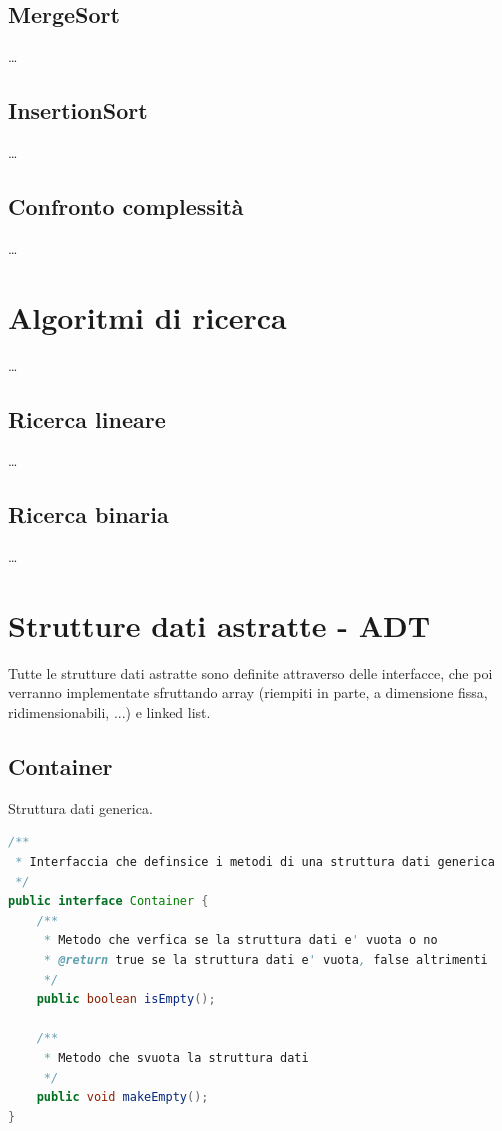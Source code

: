 \documentclass{article}
\begin{document}
\subsection{MergeSort}
\dots

\subsection{InsertionSort}
\dots

\subsection{Confronto complessità}
\dots

\section{Algoritmi di ricerca}
\dots

\subsection{Ricerca lineare}
\dots

\subsection{Ricerca binaria}
\dots

\newpage


\section{Strutture dati astratte - ADT}
Tutte le strutture dati astratte sono definite attraverso delle interfacce, che poi verranno implementate sfruttando array (riempiti
in parte, a dimensione fissa, ridimensionabili, ...) e linked list.

\subsection{Container}
Struttura dati generica.

\begin{lstlisting}[language=Java]
/**
 * Interfaccia che definsice i metodi di una struttura dati generica
 */
public interface Container {
	/**
	 * Metodo che verfica se la struttura dati e' vuota o no
	 * @return true se la struttura dati e' vuota, false altrimenti
	 */
	public boolean isEmpty();

	/**
	 * Metodo che svuota la struttura dati
	 */
	public void makeEmpty();
}
\end{lstlisting}
\end{document}
